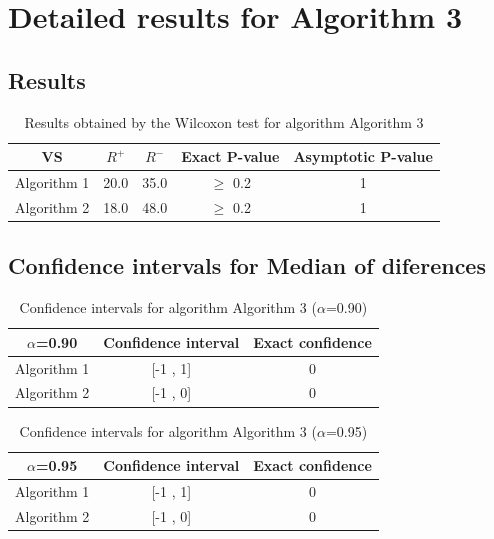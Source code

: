 \documentclass[a4paper,10pt]{article}
\begin{document}
 \clearpage 


\section{Detailed results for Algorithm 3}


\subsection{Results}

\begin{table}[!htp]
\centering\small
\begin{tabular}{
|c|c|c|c|c|}
\hline
 VS & $R^{+}$ & $R^{-}$ & Exact P-value & Asymptotic P-value \\ \hline 
Algorithm 1 & 20.0 & 35.0 & $\geq$ 0.2 & 1\\ \hline 
Algorithm 2 & 18.0 & 48.0 & $\geq$ 0.2 & 1\\ \hline 

\end{tabular}
\caption{Results obtained by the Wilcoxon test for algorithm Algorithm 3}
\end{table}

\subsection{Confidence intervals for Median of diferences}

\begin{table}[!htp]
\centering\small
\begin{tabular}{
|c|c|c|}
\hline
 $\alpha$=0.90 & Confidence interval & Exact confidence \\ \hline 
Algorithm 1 & [-1 , 1] & 0\\ \hline 
Algorithm 2 & [-1 , 0] & 0\\ \hline 

\end{tabular}
\caption{Confidence intervals for algorithm Algorithm 3 ($\alpha$=0.90)}
\end{table}
\begin{table}[!htp]
\centering\small
\begin{tabular}{
|c|c|c|}
\hline
 $\alpha$=0.95 & Confidence interval & Exact confidence \\ \hline 
Algorithm 1 & [-1 , 1] & 0\\ \hline 
Algorithm 2 & [-1 , 0] & 0\\ \hline 

\end{tabular}
\caption{Confidence intervals for algorithm Algorithm 3 ($\alpha$=0.95)}
\end{table}

 \clearpage 
\end{document}
